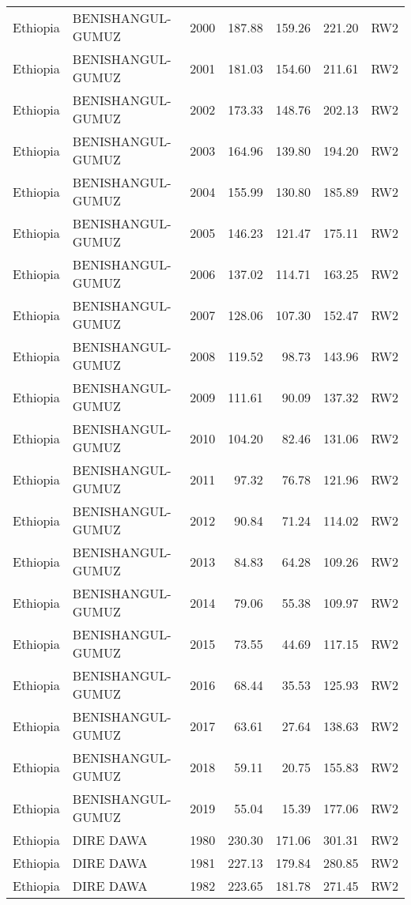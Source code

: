 \begin{longtable}{lllrrrl}
  Ethiopia & BENISHANGUL-GUMUZ & 2000 & 187.88 & 159.26 & 221.20 & RW2 \\ 
  Ethiopia & BENISHANGUL-GUMUZ & 2001 & 181.03 & 154.60 & 211.61 & RW2 \\ 
  Ethiopia & BENISHANGUL-GUMUZ & 2002 & 173.33 & 148.76 & 202.13 & RW2 \\ 
  Ethiopia & BENISHANGUL-GUMUZ & 2003 & 164.96 & 139.80 & 194.20 & RW2 \\ 
  Ethiopia & BENISHANGUL-GUMUZ & 2004 & 155.99 & 130.80 & 185.89 & RW2 \\ 
  Ethiopia & BENISHANGUL-GUMUZ & 2005 & 146.23 & 121.47 & 175.11 & RW2 \\ 
  Ethiopia & BENISHANGUL-GUMUZ & 2006 & 137.02 & 114.71 & 163.25 & RW2 \\ 
  Ethiopia & BENISHANGUL-GUMUZ & 2007 & 128.06 & 107.30 & 152.47 & RW2 \\ 
  Ethiopia & BENISHANGUL-GUMUZ & 2008 & 119.52 & 98.73 & 143.96 & RW2 \\ 
  Ethiopia & BENISHANGUL-GUMUZ & 2009 & 111.61 & 90.09 & 137.32 & RW2 \\ 
  Ethiopia & BENISHANGUL-GUMUZ & 2010 & 104.20 & 82.46 & 131.06 & RW2 \\ 
  Ethiopia & BENISHANGUL-GUMUZ & 2011 & 97.32 & 76.78 & 121.96 & RW2 \\ 
  Ethiopia & BENISHANGUL-GUMUZ & 2012 & 90.84 & 71.24 & 114.02 & RW2 \\ 
  Ethiopia & BENISHANGUL-GUMUZ & 2013 & 84.83 & 64.28 & 109.26 & RW2 \\ 
  Ethiopia & BENISHANGUL-GUMUZ & 2014 & 79.06 & 55.38 & 109.97 & RW2 \\ 
  Ethiopia & BENISHANGUL-GUMUZ & 2015 & 73.55 & 44.69 & 117.15 & RW2 \\ 
  Ethiopia & BENISHANGUL-GUMUZ & 2016 & 68.44 & 35.53 & 125.93 & RW2 \\ 
  Ethiopia & BENISHANGUL-GUMUZ & 2017 & 63.61 & 27.64 & 138.63 & RW2 \\ 
  Ethiopia & BENISHANGUL-GUMUZ & 2018 & 59.11 & 20.75 & 155.83 & RW2 \\ 
  Ethiopia & BENISHANGUL-GUMUZ & 2019 & 55.04 & 15.39 & 177.06 & RW2 \\ 
  Ethiopia & DIRE DAWA & 1980 & 230.30 & 171.06 & 301.31 & RW2 \\ 
  Ethiopia & DIRE DAWA & 1981 & 227.13 & 179.84 & 280.85 & RW2 \\ 
  Ethiopia & DIRE DAWA & 1982 & 223.65 & 181.78 & 271.45 & RW2 \\ 

\end{longtable}
